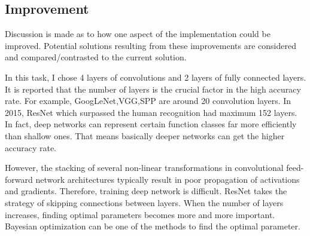 \subsection{Improvement}
Discussion is made as to how one aspect of the implementation could be improved. Potential solutions resulting from these improvements are considered and compared/contrasted to the current solution.


In this task, I chose 4 layers of convolutions and 2 layers of fully connected layers. It is reported that the number of layers is the crucial factor in the high accuracy rate. For example, GoogLeNet,VGG,SPP are around 20 convolution layers. In 2015, ResNet which surpassed the human recognition had maximum 152 layers. In fact, deep networks can represent certain function classes far more efficiently than shallow ones. That means basically deeper networks can get the higher accuracy rate.

However, the stacking of several non-linear transformations in convolutional feed-forward network architectures typically result in poor propagation of activations and gradients. Therefore, training deep network is difficult. ResNet takes the strategy of skipping connections between layers. When the number of layers increases, finding optimal parameters becomes more and more important. Bayesian optimization can be one of the methods to find the optimal parameter.  